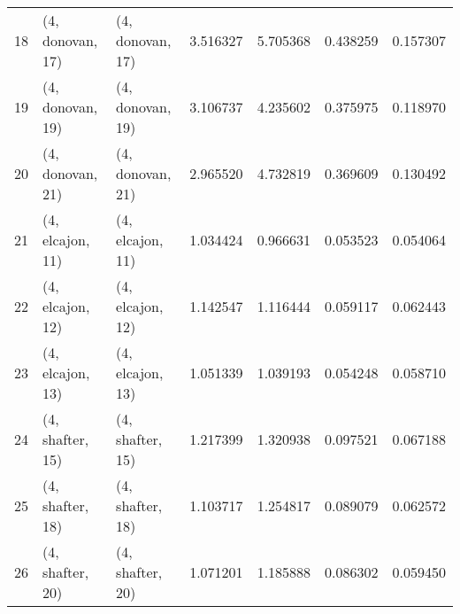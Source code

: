 \begin{tabular}{lllrrrr}
18 &  (4, donovan, 17) &  (4, donovan, 17) &  3.516327 &  5.705368 &   0.438259 &  0.157307 \\
19 &  (4, donovan, 19) &  (4, donovan, 19) &  3.106737 &  4.235602 &   0.375975 &  0.118970 \\
20 &  (4, donovan, 21) &  (4, donovan, 21) &  2.965520 &  4.732819 &   0.369609 &  0.130492 \\
21 &  (4, elcajon, 11) &  (4, elcajon, 11) &  1.034424 &  0.966631 &   0.053523 &  0.054064 \\
22 &  (4, elcajon, 12) &  (4, elcajon, 12) &  1.142547 &  1.116444 &   0.059117 &  0.062443 \\
23 &  (4, elcajon, 13) &  (4, elcajon, 13) &  1.051339 &  1.039193 &   0.054248 &  0.058710 \\
24 &  (4, shafter, 15) &  (4, shafter, 15) &  1.217399 &  1.320938 &   0.097521 &  0.067188 \\
25 &  (4, shafter, 18) &  (4, shafter, 18) &  1.103717 &  1.254817 &   0.089079 &  0.062572 \\
26 &  (4, shafter, 20) &  (4, shafter, 20) &  1.071201 &  1.185888 &   0.086302 &  0.059450 \\
\bottomrule
\end{tabular}
